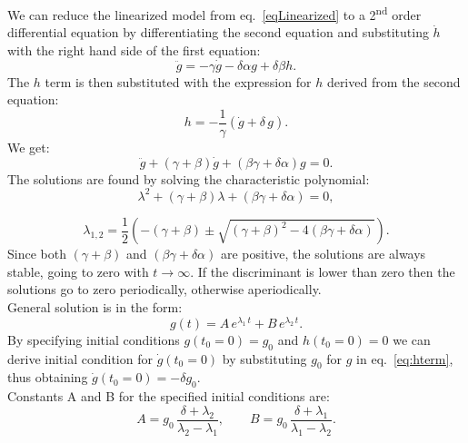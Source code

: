 \documentclass{article}
\begin{document}
We can reduce the linearized model from eq.~\ref{eqLinearized} to a 2\textsuperscript{nd} order differential equation by differentiating the second equation and substituting $\dot h$ with the right hand side of the first equation:
%
\begin{equation*}
\ddot g=-\gamma \dot g -\delta \alpha g + \delta \beta h.
\end{equation*}
%
 The $h$ term is then substituted with the expression for $h$ derived from the second equation:
% 
\begin{equation}
\label{eq:hterm}
h = -\frac{1}{\gamma}\left( \dot{g} + \delta\,g\right).
\end{equation} 
%
We get:
\begin{equation}
	\label{Eq:secondOrderDE}
	\ddot g+(\gamma+\beta)\dot g+(\beta \gamma+\delta \alpha)g=0.
\end{equation}
%
The solutions are found by solving the characteristic polynomial:
%
\begin{equation}
	\label{Eq:charEqn}
	\lambda^2+(\gamma+\beta)\lambda+(\beta\gamma+\delta\alpha)=0,
\end{equation}

\begin{equation}
	\label{Eq:rootsOfCharEqn}
	\lambda_{1,2}=\frac{1}{2}\left(-(\gamma+\beta)\pm \sqrt{(\gamma+\beta)^2-4(\beta\gamma+\delta\alpha)}\right).
\end{equation}
%
Since both $(\gamma+\beta)$ and $(\beta\gamma+\delta\alpha)$ are positive, the solutions are always stable, going to zero with $t\rightarrow \infty$. If the discriminant is lower than zero then the solutions go to zero periodically, otherwise aperiodically.\\
%
%
General solution is in the form:
\begin{equation}
	\label{Eq:genSol}
	g(t) = A\,e^{\lambda_1 \, t} + B\,e^{\lambda_2 \, t}.
\end{equation}
%
By specifying initial conditions $g(t_0=0) = g_0$ and $h(t_0=0)=0$ we can derive initial condition for $\dot g(t_0=0)$ by substituting $g_0$ for $g$ in eq.~\ref{eq:hterm}, thus obtaining $\dot g(t_0=0)=-\delta g_0$.\\
%
Constants A and B for the specified initial conditions are:
%
\begin{equation*}
	\label{Eq:genSolParams}
	A = g_0\,\frac{\delta+\lambda_2}{\lambda_2-\lambda_1}, \qquad B = g_0\,\frac{\delta+\lambda_1}{\lambda_1-\lambda_2}.
\end{equation*}
\end{document}
